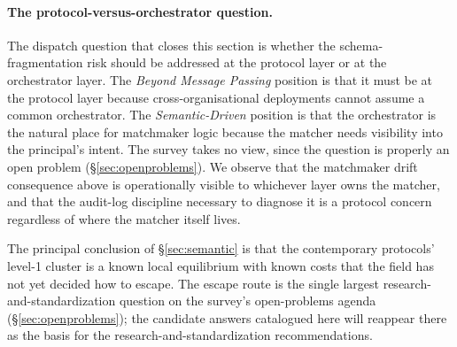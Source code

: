 \paragraph{The protocol-versus-orchestrator question.}
The dispatch question that closes this section is whether
the schema-fragmentation risk should be addressed at the
protocol layer or at the orchestrator layer. The
\emph{Beyond Message Passing} position is that it must
be at the protocol layer because cross-organisational
deployments cannot assume a common orchestrator. The
\emph{Semantic-Driven} position is that the orchestrator
is the natural place for matchmaker logic because the
matcher needs visibility into the principal's intent.
The survey takes no view, since the question is properly an
open problem (\S\ref{sec:openproblems}). We observe
that the matchmaker drift consequence above is
operationally visible to whichever layer owns the
matcher, and that the audit-log discipline necessary to
diagnose it is a protocol concern regardless of where the
matcher itself lives.

The principal conclusion of \S\ref{sec:semantic} is that
the contemporary protocols' level-1 cluster is a known
local equilibrium with known costs that the field has not
yet decided how to escape. The escape route is the
single largest research-and-standardization question on
the survey's open-problems agenda
(\S\ref{sec:openproblems}); the candidate answers
catalogued here will reappear there as the basis for the
research-and-standardization recommendations.
